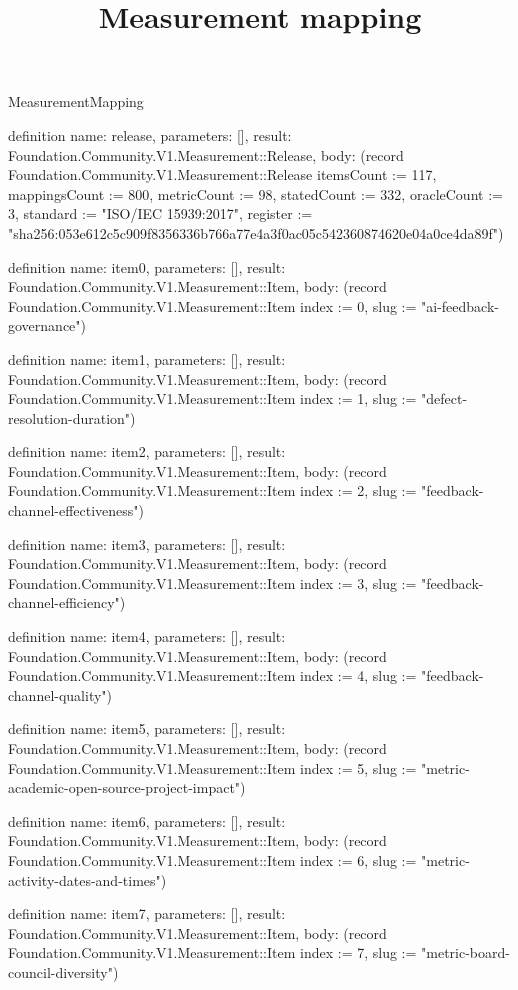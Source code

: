 \begin{lexlean}{MeasurementMapping}
\title{Measurement mapping}
\begin{semanticmodule}
definition{
  name: release,
  parameters: [],
  result: Foundation.Community.V1.Measurement::Release,
  body: (record Foundation.Community.V1.Measurement::Release {itemsCount := 117, mappingsCount := 800, metricCount := 98, statedCount := 332, oracleCount := 3, standard := "ISO/IEC 15939:2017", register := "sha256:053e612c5c909f8356336b766a77e4a3f0ac05c542360874620e04a0ce4da89f"})
}

definition{
  name: item0,
  parameters: [],
  result: Foundation.Community.V1.Measurement::Item,
  body: (record Foundation.Community.V1.Measurement::Item {index := 0, slug := "ai-feedback-governance"})
}

definition{
  name: item1,
  parameters: [],
  result: Foundation.Community.V1.Measurement::Item,
  body: (record Foundation.Community.V1.Measurement::Item {index := 1, slug := "defect-resolution-duration"})
}

definition{
  name: item2,
  parameters: [],
  result: Foundation.Community.V1.Measurement::Item,
  body: (record Foundation.Community.V1.Measurement::Item {index := 2, slug := "feedback-channel-effectiveness"})
}

definition{
  name: item3,
  parameters: [],
  result: Foundation.Community.V1.Measurement::Item,
  body: (record Foundation.Community.V1.Measurement::Item {index := 3, slug := "feedback-channel-efficiency"})
}

definition{
  name: item4,
  parameters: [],
  result: Foundation.Community.V1.Measurement::Item,
  body: (record Foundation.Community.V1.Measurement::Item {index := 4, slug := "feedback-channel-quality"})
}

definition{
  name: item5,
  parameters: [],
  result: Foundation.Community.V1.Measurement::Item,
  body: (record Foundation.Community.V1.Measurement::Item {index := 5, slug := "metric-academic-open-source-project-impact"})
}

definition{
  name: item6,
  parameters: [],
  result: Foundation.Community.V1.Measurement::Item,
  body: (record Foundation.Community.V1.Measurement::Item {index := 6, slug := "metric-activity-dates-and-times"})
}

definition{
  name: item7,
  parameters: [],
  result: Foundation.Community.V1.Measurement::Item,
  body: (record Foundation.Community.V1.Measurement::Item {index := 7, slug := "metric-board-council-diversity"})
}


\end{semanticmodule}
\end{lexlean}
